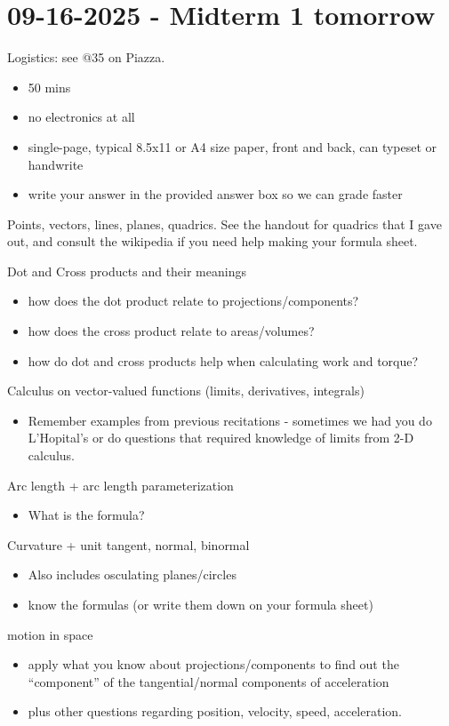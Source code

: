 \documentclass[]{mangos-musings}
\begin{document}
\newpage
\section{09-16-2025 - Midterm 1 tomorrow}
Logistics: see @35 on Piazza.
\begin{itemize}
  \item 50 mins 
  \item no electronics at all 
  \item single-page, typical 8.5x11 or A4 size paper, front and back, can typeset or handwrite
  \item write your answer in the provided answer box so we can grade faster
\end{itemize}
Points, vectors, lines, planes, quadrics. See the handout for quadrics that I gave out, and consult the wikipedia if you need help making your formula sheet.

Dot and Cross products and their meanings
\begin{itemize}
  \item how does the dot product relate to projections/components?
  \item how does the cross product relate to areas/volumes?
  \item how do dot and cross products help when calculating work and torque?
\end{itemize}

Calculus on vector-valued functions (limits, derivatives, integrals)
\begin{itemize}
  \item Remember examples from previous recitations - sometimes we had you do L'Hopital's or do questions that required knowledge of limits from 2-D calculus.
\end{itemize}

Arc length + arc length parameterization 
\begin{itemize}
  \item What is the formula?
\end{itemize}

Curvature + unit tangent, normal, binormal
\begin{itemize}
  \item Also includes osculating planes/circles 
  \item know the formulas (or write them down on your formula sheet)
\end{itemize}

motion in space 
\begin{itemize}
  \item apply what you know about projections/components to find out the ``component'' of the tangential/normal components of acceleration
  \item plus other questions regarding position, velocity, speed, acceleration.
\end{itemize}
\end{document}
